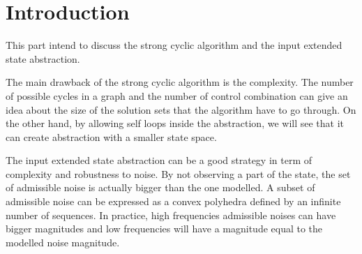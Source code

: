 \section{Introduction}
This part intend to discuss the strong cyclic algorithm and the input extended state abstraction.

The main drawback of the strong cyclic algorithm is the complexity.
The number of possible cycles in a graph and the number of control combination can give an idea about the size of the solution sets that the algorithm have to go through.
On the other hand, by allowing self loops inside the abstraction, we will see that it can create abstraction with a smaller state space.

The input extended state abstraction can be a good strategy in term of complexity and robustness to noise.
By not observing a part of the state, the set of admissible noise is actually bigger than the one modelled.
A subset of admissible noise can be expressed as a convex polyhedra defined by an infinite number of sequences.
In practice, high frequencies admissible noises can have bigger magnitudes and low frequencies will have a magnitude equal to the modelled noise magnitude.


